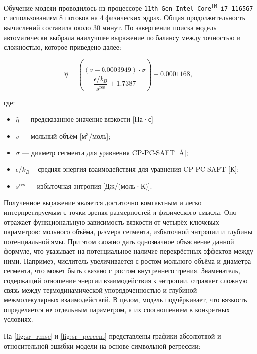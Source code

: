\documentclass[a4paper,12pt]{article}
\begin{document}
Обучение модели проводилось на процессоре \texttt{11th Gen Intel\textsuperscript{\textregistered} Core\textsuperscript{TM} i7-1165G7} с использованием 8 потоков на 4 физических ядрах. Общая продолжительность вычислений составила около 30 минут. По завершении поиска модель автоматически выбрала наилучшее выражение по балансу между точностью и сложностью, которое приведено далее:
    
    \begin{equation}
    \hat{\eta} = \left( \frac{(v - 0.0003949) \cdot \sigma}{\dfrac{\epsilon / k_B}{s^{\text{res}}} + 1.7387} \right) - 0.0001168,
    \end{equation}
    
    где:
    \begin{itemize}
      \item \( \hat{\eta} \) — предсказанное значение вязкости [Па·с];
      \item \( v \) — мольный объём [м\(^3\)/моль];
      \item \( \sigma \) — диаметр сегмента для уравнения CP-PC-SAFT [\si{\angstrom}];
      \item \( \epsilon/k_B \) -- средняя энергия взаимодействия для уравнения CP-PC-SAFT [К];
      \item \( s^{\text{res}} \) — избыточная энтропия [Дж/(моль·К)].
    \end{itemize}

    Полученное выражение является достаточно компактным и легко интерпретируемым с точки зрения размерностей и физического смысла. Оно отражает функциональную зависимость вязкости от четырёх ключевых параметров: мольного объёма, размера сегмента, избыточной энтропии и глубины потенциальной ямы. При этом сложно дать однозначное объяснение данной формуле, что указывает на потенциальное наличие перекрёстных эффектов между ними. Например, числитель увеличивается с ростом мольного объёма и диаметра сегмента, что может быть связано с ростом внутреннего трения. Знаменатель, содержащий отношение энергии взаимодействия к энтропии, отражает сложную связь между термодинамической упорядоченностью и глубиной межмолекулярных взаимодействий. В целом, модель подчёркивает, что вязкость определяется не отдельным параметром, а их соотношением в конкретных условиях.

    \medskip
    
    На \autoref{fig:sr_rmse} и \autoref{fig:sr_percent} представлены графики абсолютной и относительной ошибки модели на основе символьной регрессии:
    
\end{document}
